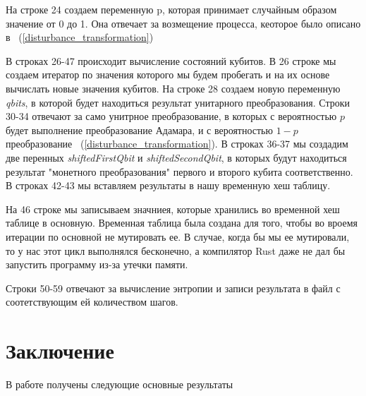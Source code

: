 \documentclass[a4paper]{report}
\begin{document}
На строке 24 создаем переменную p, которая принимает случайным образом значение от 0 до 1. Она отвечает за возмещение процесса, кеоторое было описано в ~(\ref {disturbance_transformation})

В строках 26-47  происходит вычисление состояний кубитов. В 26 строке мы создаем итератор по значения которого мы будем пробегать и на их основе вычислать новые значения кубитов.
На строке 28 создаем новую переменную \textit{qbits}, в которой будет находиться результат унитарного преобразования.
Строки 30-34 отвечают за само унитрное преобразование, в которых с вероятностью $p$ будет выполнение преобразование Адамара, и с вероятностью $1 - p$  преобразование ~(\ref {disturbance_transformation}).
В строках 36-37 мы создадим две перенных \textit{shiftedFirstQbit} и \textit{shiftedSecondQbit}, в которых будут находиться результат "монетного преобразования" первого и второго кубита соответственно.
В строках 42-43 мы вставляем результаты в нашу временную хеш таблицу.

На 46 строке мы записываем значниея, которые хранились во временной хеш таблице в основную. Временная таблица была создана для того, чтобы во вроемя итерации по основной не мутировать ее. В случае, когда бы мы ее мутировали, то у нас этот цикл выполнялся бесконечно, а компилятор Rust даже не дал бы запустить программу из-за утечки памяти.

Строки 50-59 отвечают за вычисление энтропии и записи результата в файл с соотетствующим ей количеством шагов. 


\newpage
{}
\section*{Заключение}

В работе получены следующие основные результаты


\newpage
{}
\end{document}
